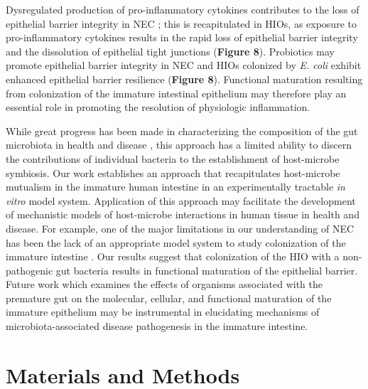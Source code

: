 \documentclass[9pt,lineo]{elife}
\begin{document}
Dysregulated production of pro-inflammatory cytokines  contributes to the loss of epithelial barrier integrity in NEC \citep{Tanner:2015,Hackam:2013,Neu:2011,Nanthakumar:2011,Halpern:2003,Ford:1997,Ford:1996,Tan:1993}; this is recapitulated in HIOs, as exposure to pro-inflammatory cytokines results in the rapid loss of epithelial barrier integrity and the dissolution of epithelial tight junctions (\textbf{Figure 8}). Probiotics may promote epithelial barrier integrity in NEC \citep{Robinson:2014,Alfaleh:2011,Underwood:2014,Khailova:2009} and HIOs colonized by \emph{E. coli} exhibit enhanced epithelial barrier resilience (\textbf{Figure 8}). Functional maturation resulting from colonization of the immature intestinal epithelium may therefore play an essential role in promoting the resolution of physiologic inflammation.

While great progress has been made in characterizing the composition of the gut microbiota in health and disease \citep{Shreiner:2015,Costello:2012}, this approach has a limited ability to discern the contributions of individual bacteria to the establishment of host-microbe symbiosis. Our work establishes an approach that recapitulates host-microbe mutualism in the immature human intestine in an experimentally tractable \emph{in vitro} model system. Application of this approach may facilitate the development of mechanistic models of host-microbe interactions in human tissue in health and disease. For example, one of the major limitations in our understanding of NEC has been the lack of an appropriate model system to study colonization of the immature intestine \citep{Neu:2011,Balimane:2005,Tanner:2015,Nguyen:2015}. Our results suggest that colonization of the HIO with a non-pathogenic gut bacteria results in functional maturation of the epithelial barrier. Future work which examines the effects of organisms associated with the premature gut \citep{Morrow:2013,Greenwood:2014,Ward:2016} on the molecular, cellular, and functional maturation of the immature epithelium may be instrumental in elucidating mechanisms of microbiota-associated disease pathogenesis in the immature intestine.

\section*{{\bfseries\sffamily } Materials and Methods}
\label{sec:orgheadline27}
\end{document}
